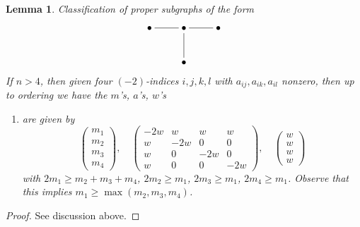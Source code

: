 \documentclass{stacks-project}
\theoremstyle{plain}
\newtheorem{lemma}[subsection]{Lemma}
\theoremstyle{definition}
\theoremstyle{remark}
\numberwithin{equation}{subsection}
\begin{document}
\begin{lemma}
\label{lemma-D4}
Classification of proper subgraphs of the form
$$
\xymatrix{
\bullet \ar@{-}[r] & \bullet \ar@{-}[r] \ar@{-}[d] & \bullet \\
& \bullet
}
$$
If $n > 4$, then given four $(-2)$-indices $i, j, k, l$
with $a_{ij}, a_{ik}, a_{il}$ nonzero, then up
to ordering we have the $m$'s, $a$'s, $w$'s
\begin{enumerate}
\item
\label{item-D4}
are given by
$$
\left(
\begin{matrix}
m_1 \\
m_2 \\
m_3 \\
m_4
\end{matrix}
\right),
\quad
\left(
\begin{matrix}
-2w & w & w & w \\
w & -2w & 0 & 0 \\
w & 0 & -2w & 0 \\
w & 0 & 0 & -2w 
\end{matrix}
\right),
\quad
\left(
\begin{matrix}
w \\
w \\
w \\
w
\end{matrix}
\right)
$$
with $2m_1 \geq m_2 + m_3 + m_4$, $2m_2 \geq m_1$, $2m_3 \geq m_1$,
$2m_4 \geq m_1$. Observe that this implies $m_1 \geq \max(m_2, m_3, m_4)$.
\end{enumerate}
\end{lemma}

\begin{proof}
See discussion above.
\end{proof}
\end{document}
